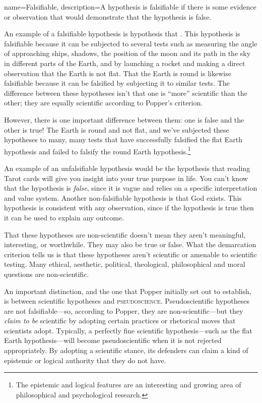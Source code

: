 {
name=Falsifiable,
description={A hypothesis is falsifiable if there is some evidence or observation that would demonstrate that the hypothesis is false.}
}

An example of a falsifiable hypothesis is hypothesis that . This hypothesis is falsifiable because it can be subjected to several tests such as measuring the angle of approaching ships, shadows, the position of the moon and its path in the sky in different parts of the Earth, and by launching a rocket and making a direct observation that the Earth is not flat. That the Earth is round is likewise falsifiable because it can be falsified by subjecting it to similar tests. The difference between these hypotheses isn't that one is ``more'' scientific than the other; they are equally scientific according to Popper's criterion.

However, there is one important difference between them: one is false and the other is true! The Earth is round and not flat, and we've subjected these hypotheses to many, many tests that have successfully falsified the flat Earth hypothesis and failed to falsify the round Earth hypothesis.\footnote{The epistemic and logical features are an interesting and growing area of philosophical and psychological research.}

An example of an unfalsifiable hypothesis would be the hypothesis that reading Tarot cards will give you insight into your true purpose in life. You can't know that the hypothesis is \emph{false}, since it is vague and relies on a specific interpretation and value system. Another non-falsifiable hypothesis is that God exists. This hypothesis is consistent with any observation, since if the hypothesis is true then it can be used to explain any outcome.

That these hypotheses are non-scientific doesn't mean they aren't meaningful, interesting, or worthwhile. They may also be true or false. What the demarcation criterion tells us is that these hypotheses aren't scientific or amenable to scientific testing. Many ethical, aesthetic, political, theological, philosophical and moral questions are non-scientific.

An important distinction, and the one that Popper initially set out to establish, is between scientific hypotheses and \textsc{\gls{pseudoscience}}. Pseudoscientific hypotheses are not falsifiable---so, according to Popper, they are non-scientific---but they \emph{claim to be} scientific by adopting certain practices or rhetorical moves that scientists adopt. Typically, a perfectly fine scientific hypothesis---such as the flat Earth hypothesis---will become pseudoscientific when it is not rejected appropriately. By adopting a scientific stance, its defenders can claim a kind of epistemic or logical authority that they do not have. 

